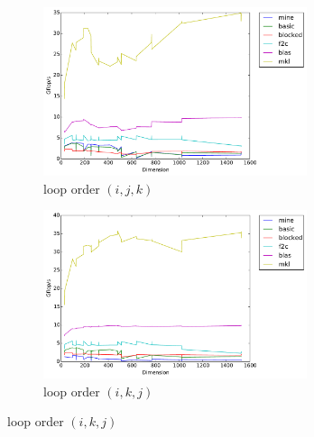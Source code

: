 \documentclass[12pt]{article}
\numberwithin{equation}{section}
\begin{document}
\begin{figure}[!ht]
   \begin{subfigure}
      \centering
        \begin{center}
      \includegraphics[width=0.85\textwidth] {ijk}
        \end{center}
      \label{aload0}
      \caption{loop order $(i, j, k)$}
  \end{subfigure}
  \begin{subfigure}
      \centering
        \begin{center}
      \includegraphics[width=0.85\textwidth] {ikj}
        \end{center}
      \label{aload1}
      \caption{loop order $(i, k, j)$}
  \end{subfigure}

\end{figure}
\end{document}
